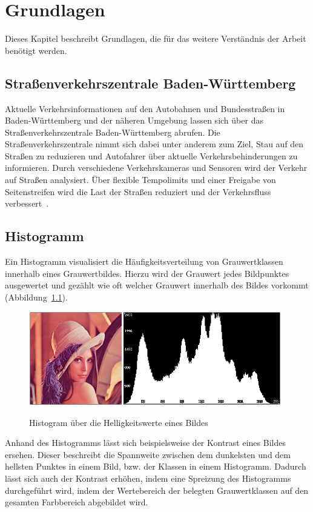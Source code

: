 \chapter{Grundlagen}

Dieses Kapitel beschreibt Grundlagen, die für das weitere Verständnis der Arbeit benötigt werden.

\section{Straßenverkehrszentrale Baden-Württemberg} %
Aktuelle Verkehrsinformationen auf den Autobahnen und Bundesstraßen in Baden-Württemberg und der näheren Umgebung lassen sich über das Straßenverkehrszentrale Baden-Württemberg abrufen. Die Straßenverkehrszentrale nimmt sich dabei unter anderem zum Ziel, Stau auf den Straßen zu reduzieren und Autofahrer über aktuelle Verkehrsbehinderungen zu informieren.
Durch verschiedene Verkehrskameras und Sensoren wird der Verkehr auf Straßen analysiert. Über flexible Tempolimits und einer Freigabe von Seitenstreifen wird die Last der Straßen reduziert und der Verkehrsfluss verbessert~\cite{svzbw}.

\section{Histogramm} %
Ein Histogramm visualisiert die Häufigkeitsverteilung von Grauwertklassen innerhalb eines Grauwertbildes.
Hierzu wird der Grauwert jedes Bildpunktes ausgewertet und gezählt wie oft welcher Grauwert innerhalb des Bildes vorkommt (Abbildung~\ref{fig:Histogramm}).

\begin{figure}[ht]
   \centering
     \includegraphics[width=11cm]{Bilder/histogram} \\
 \caption{Histogram über die Helligkeitswerte eines Bildes}
 \label{fig:Histogramm}
\end{figure}

Anhand des Histogramms lässt sich beispielsweise der Kontrast eines Bildes ersehen. 
Dieser beschreibt die Spannweite zwischen dem dunkelsten und dem hellsten Punktes in einem Bild, bzw. der Klassen in einem Histogramm.
Dadurch lässt sich auch der Kontrast erhöhen, indem eine Spreizung des Histogramms durchgeführt wird, indem
der Wertebereich der belegten Grauwertklassen auf den gesamten Farbbereich abgebildet wird.

